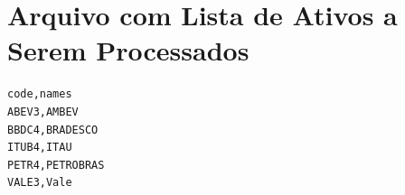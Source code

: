\documentclass[grad,numbers]{coppe}
\begin{document}
		\section{Arquivo com Lista de Ativos a Serem Processados}
					\begin{verbatim}
code,names
ABEV3,AMBEV
BBDC4,BRADESCO
ITUB4,ITAU
PETR4,PETROBRAS
VALE3,Vale
					\end{verbatim}
\end{document}
